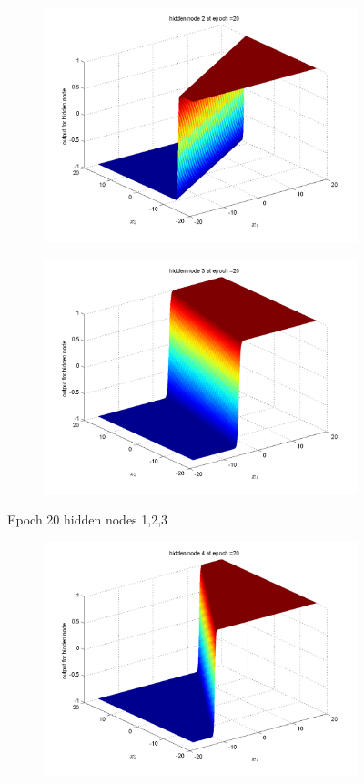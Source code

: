 \documentclass{article}
\begin{document}
\begin{flushleft}
\begin{figure}
\begin{subfigure}{.3\textwidth}
\end{subfigure}%
\begin{subfigure}{.3\textwidth}
  \centering
  \includegraphics[width=.8\linewidth]{Classification/linearlySeparable/h20_2}
  
\end{subfigure}
\begin{subfigure}{.3\textwidth}
  \centering
  \includegraphics[width=.8\linewidth]{Classification/linearlySeparable/h20_3}
  
\end{subfigure}
\caption{Epoch 20 hidden nodes 1,2,3}
\end{figure}

\begin{figure}
\begin{subfigure}{.3\textwidth}
  \centering
  \includegraphics[width=.8\linewidth]{Classification/linearlySeparable/h20_4}
 

\end{subfigure}
\end{figure}
\end{flushleft}
\end{document}
